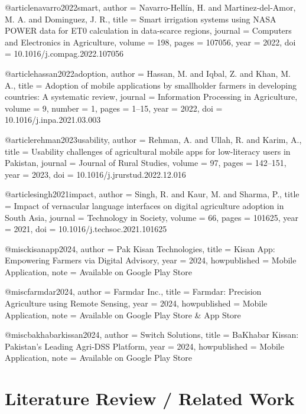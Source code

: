 @article{navarro2022smart,
  author  = {Navarro-Hellín, H. and Martinez-del-Amor, M. A. and Dominguez, J. R.},
  title   = {Smart irrigation systems using NASA POWER data for ET0 calculation in data-scarce regions},
  journal = {Computers and Electronics in Agriculture},
  volume  = {198},
  pages   = {107056},
  year    = {2022},
  doi     = {10.1016/j.compag.2022.107056}
}

@article{hassan2022adoption,
  author  = {Hassan, M. and Iqbal, Z. and Khan, M. A.},
  title   = {Adoption of mobile applications by smallholder farmers in developing countries: A systematic review},
  journal = {Information Processing in Agriculture},
  volume  = {9},
  number  = {1},
  pages   = {1--15},
  year    = {2022},
  doi     = {10.1016/j.inpa.2021.03.003}
}

@article{rehman2023usability,
  author  = {Rehman, A. and Ullah, R. and Karim, A.},
  title   = {Usability challenges of agricultural mobile apps for low-literacy users in Pakistan},
  journal = {Journal of Rural Studies},
  volume  = {97},
  pages   = {142--151},
  year    = {2023},
  doi     = {10.1016/j.jrurstud.2022.12.016}
}

@article{singh2021impact,
  author  = {Singh, R. and Kaur, M. and Sharma, P.},
  title   = {Impact of vernacular language interfaces on digital agriculture adoption in South Asia},
  journal = {Technology in Society},
  volume  = {66},
  pages   = {101625},
  year    = {2021},
  doi     = {10.1016/j.techsoc.2021.101625}
}

@misc{kisanapp2024,
  author       = {{Pak Kisan Technologies}},
  title        = {Kisan App: Empowering Farmers via Digital Advisory},
  year         = {2024},
  howpublished = {Mobile Application},
  note         = {Available on Google Play Store}
}

@misc{farmdar2024,
  author       = {{Farmdar Inc.}},
  title        = {Farmdar: Precision Agriculture using Remote Sensing},
  year         = {2024},
  howpublished = {Mobile Application},
  note         = {Available on Google Play Store \& App Store}
}

@misc{bakhabarkissan2024,
  author       = {{Switch Solutions}},
  title        = {BaKhabar Kissan: Pakistan's Leading Agri-DSS Platform},
  year         = {2024},
  howpublished = {Mobile Application},
  note         = {Available on Google Play Store}
}

\chapter{Literature Review / Related Work}

